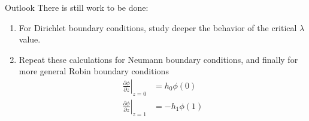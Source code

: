 \begin{frame}{Outlook}
	There is still work to be done:
	\begin{enumerate}
		\item For Dirichlet boundary conditions, study deeper the behavior of the critical $\lambda$ value.
		\item Repeat these calculations for Neumann boundary conditions, and finally for more general Robin boundary conditions 
		\begin{align}
			\left. \frac{\partial \phi}{\partial z}\right|_{z=0} &= h_0 \phi(0) \\
				\left. \frac{\partial \phi}{\partial z}\right|_{z=1} &= -h_1 \phi(1)
		\end{align}
	\end{enumerate}
	
\end{frame}

